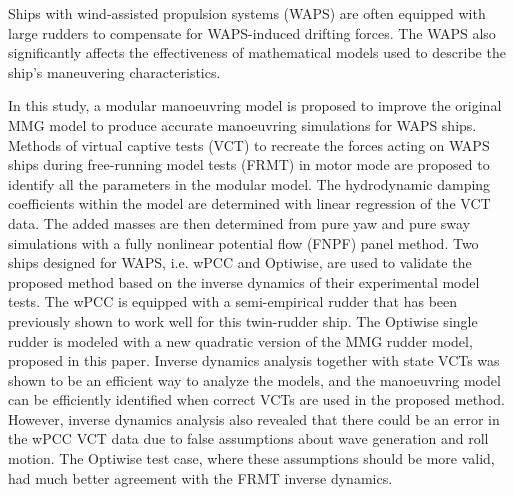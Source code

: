 Ships with wind-assisted propulsion systems (WAPS) are often equipped with large rudders to compensate for WAPS-induced drifting forces. The WAPS also significantly affects the effectiveness of mathematical models used to describe the ship's maneuvering characteristics.

In this study, a modular manoeuvring model is proposed to improve the original MMG model to produce accurate manoeuvring simulations for WAPS ships. 
Methods of virtual captive tests (VCT) to recreate the forces acting on WAPS ships during free-running model tests (FRMT) in motor mode are proposed to identify all the parameters in the modular model. 
The hydrodynamic damping coefficients within the model are determined with linear regression of the VCT data. The added masses are then determined from pure yaw and pure sway simulations with a fully nonlinear potential flow (FNPF) panel method.
Two ships designed for WAPS, i.e. wPCC and Optiwise, are used to validate the proposed method based on the inverse dynamics of their experimental model tests. The wPCC is equipped with a semi-empirical rudder that has been previously shown to work well for this twin-rudder ship. The Optiwise single rudder is modeled with a new quadratic version of the MMG rudder model, proposed in this paper. 
Inverse dynamics analysis together with state VCTs was shown to be an efficient way to analyze the models, and the manoeuvring model can be efficiently identified when correct VCTs are used in the proposed method.
However, inverse dynamics analysis also revealed that there could be an error in the wPCC VCT data due to false assumptions about wave generation and roll motion. The Optiwise test case, where these assumptions should be more valid, had much better agreement with the FRMT inverse dynamics. 


%    

